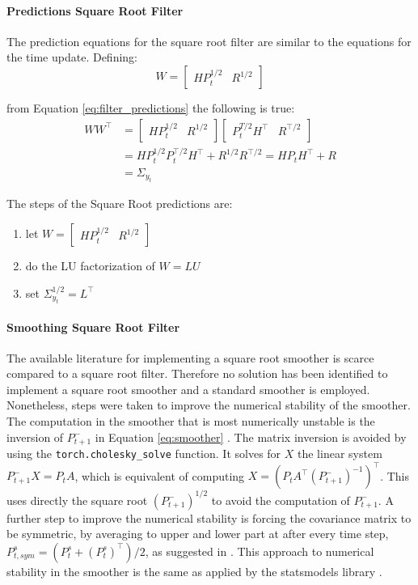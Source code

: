 \documentclass{article}
\begin{document}
\paragraph{Predictions Square Root Filter} The prediction equations for the square root filter are similar to the equations for the time update. Defining:
\begin{equation*}
    W = \begin{bmatrix}HP_{t}^{1/2} & R^{1/2}\end{bmatrix}
\end{equation*}

from Equation \ref{eq:filter_predictions} the following is true:
\begin{align*}
  WW^\top &=
  \begin{bmatrix}HP_{t}^{1/2} & R^{1/2}\end{bmatrix}\begin{bmatrix}P_{t}^{T/2}H^\top & R^{\top/2}\end{bmatrix} \\
  &= HP_{t}^{1/2}P_{t}^{\top/2}H^\top + R^{1/2}R^{\top/2} = HP_{t}H^\top + R \\ &= \Sigma_{y_t}
\end{align*}

The steps of the Square Root predictions are:
\begin{enumerate}
    \item let  $W = \begin{bmatrix}HP_t^{1/2} & R^{1/2}\end{bmatrix}$
    \item do the LU factorization of $W=LU$
    \item set $\Sigma_{y_t}^{1/2} = L^\top$
\end{enumerate}

\paragraph{Smoothing Square Root Filter} The available literature for implementing a square root smoother is scarce compared to a square root filter. Therefore no solution has been identified to implement a square root smoother and a standard smoother is employed.
Nonetheless, steps were taken to improve the numerical stability of the smoother. The computation in the smoother that is most numerically unstable is the inversion of $P^-_{t+1}$ in Equation \ref{eq:smoother} \cite{mohinder_s_grewal_kalman_2001}. The matrix inversion is avoided by using the \verb|torch.cholesky_solve| function. It solves for $X$ the linear system $P^-_{t+1}X=P_tA$, which is equivalent of computing $X = (P_tA^\top(P^-_{t+1})^{-1})^\top$. This uses directly the square root $(P^-_{t+1})^{1/2}$ to avoid the computation of $P^-_{t+1}$. A further step to improve the numerical stability is forcing the covariance matrix to be symmetric, by averaging to upper and lower part at after every time step, $P^s_{t, sym} = (P^s_t + (P^s_t)^\top)/2$, as suggested in \textcite{dan_simon_optimal_2006}.
This approach to numerical stability in the smoother is the same as applied by the \textsf{statsmodels} library \cite{noauthor_statsmodelstsastatespacekalman_filterkalmanfilter_nodate}.
\end{document}
